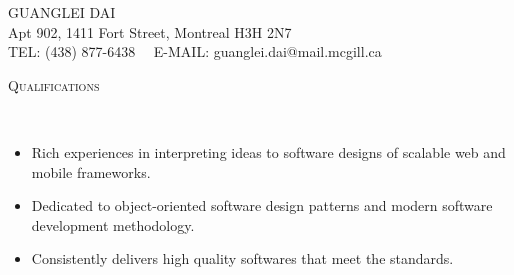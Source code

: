 \documentclass[11pt]{article}
\newenvironment{changemargin}[2]{%
  \begin{list}{}{%
    \setlength{\topsep}{0pt}%
    \setlength{\leftmargin}{#1}%
    \setlength{\rightmargin}{#2}%
    \setlength{\listparindent}{\parindent}%
    \setlength{\itemindent}{\parindent}%
    \setlength{\parsep}{\parskip}%
  }%
  \item[]}{\end{list}
}
\newcommand{\lineover}{
	\begin{changemargin}{-0.05in}{-0.05in}
		\vspace*{-8pt}
		\hrulefill \\
		\vspace*{-2pt}
	\end{changemargin}
}
\newcommand{\header}[1]{
	\begin{changemargin}{-0.5in}{-0.5in}
		\scshape{#1}\\
  	\lineover
	\end{changemargin}
}
\newcommand{\contact}[4]{
	\begin{changemargin}{-0.5in}{-0.5in}
		\begin{center}
			{\Large \scshape {#1}}\\ \smallskip
			{#2}\\ \smallskip
			{#3}\\ \smallskip
			{#4}\smallskip
		\end{center}
	\end{changemargin}
}
\newenvironment{body} {
	\vspace*{-16pt}
	\begin{changemargin}{-0.25in}{-0.5in}
  }	
	{\end{changemargin}
}
\begin{document}
\small
\contact{GUANGLEI DAI}{Apt 902, 1411 Fort Street,
Montreal H3H 2N7}{TEL: (438) 877-6438~~ E-MAIL: guanglei.dai@mail.mcgill.ca}
\smallskip
\header{Qualifications}
\begin{body}
	\begin{itemize} \itemsep -0pt  %
	\vspace{14pt}
	\item Rich experiences in interpreting ideas to software designs of scalable web and mobile frameworks. \\
	\medskip
	\item Dedicated to object-oriented software design patterns and modern software development methodology.\\
	\medskip
	\item Consistently delivers high quality softwares that meet the standards.
	\end{itemize}
\end{body}
\smallskip
\end{document}
